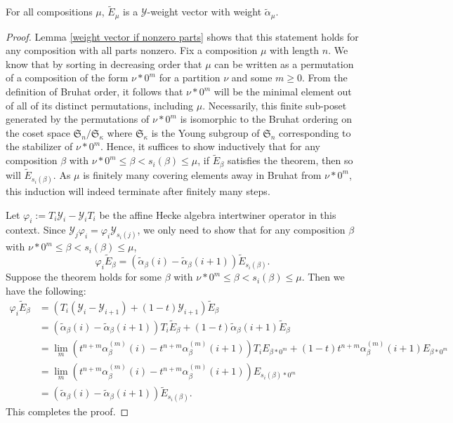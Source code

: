 \documentclass[ALCO,Unicode]{cedram}
\newcommand{\y}{{ \mathscr{Y} }}
\begin{document}
\begin{thm} \label{weight vector for all}
For all compositions $\mu$, $\widetilde{E}_{\mu}$ is a $\y$-weight vector with weight $\widetilde{\alpha}_{\mu}.$
\end{thm}

\begin{proof}
 Lemma \ref{weight vector if nonzero parts} shows that this statement holds for any composition with all parts nonzero. Fix a composition $\mu$ with length $n$. We know that by sorting in decreasing order that $\mu$ can be written as a permutation of a composition of the form $\nu * 0^m$ for a partition $\nu$ and some $m \geq 0$. From the definition of Bruhat order, it follows that $\nu*0^m$ will be the minimal element out of all of its distinct permutations, including $\mu$. Necessarily, this finite sub-poset generated by the permutations of $\nu*0^m$ is isomorphic to the Bruhat ordering on the coset space $\mathfrak{S}_n/\mathfrak{S}_{\kappa}$ where $\mathfrak{S}_{\kappa}$ is the Young subgroup of $\mathfrak{S}_n$ corresponding to the stabilizer of $\nu*0^m$. Hence, it suffices to show inductively that for any composition $\beta$ with $\nu*0^m \leq \beta < s_i(\beta) \leq \mu$, if $\widetilde{E}_{\beta}$ satisfies the theorem, then so will $\widetilde{E}_{s_i(\beta)}$. As $\mu$ is finitely many covering elements away in Bruhat from $\nu*0^m$, this induction will indeed terminate after finitely many steps.
 
Let $\varphi_i := T_i\y_i-\y_iT_i$ be the affine Hecke algebra intertwiner operator in this context. Since $\y_j\varphi_i = \varphi_i \y_{s_i(j)}$, we only need to show that for any composition $\beta$ with $\nu*0^m \leq \beta < s_i(\beta) \leq \mu$, $$\varphi_i \widetilde{E}_{\beta} = (\widetilde{\alpha}_{\beta}(i) - \widetilde{\alpha}_{\beta}(i+1))\widetilde{E}_{s_i(\beta)}.$$ Suppose the theorem holds for some $\beta$ with $\nu*0^m \leq \beta < s_i(\beta) \leq \mu$. Then we have the following:
\begin{align*}
    \varphi_{i}\widetilde{E}_{\beta} &= (T_i(\y_i - \y_{i+1}) + (1-t)\y_{i+1})\widetilde{E}_{\beta} \\
    &= (\widetilde{\alpha}_{\beta}(i)- \widetilde{\alpha}_{\beta}(i+1))T_i\widetilde{E}_{\beta} + (1-t)\widetilde{\alpha}_{\beta}(i+1)\widetilde{E}_{\beta} \\
    &= \lim_{m} (t^{n+m}\alpha_{\beta}^{(m)}(i)- t^{n+m}\alpha_{\beta}^{(m)}(i+1))T_iE_{\beta *0^m} + (1-t)t^{n+m}\alpha_{\beta}^{(m)}(i+1)E_{\beta *0^m} \\
    &= \lim_{m}(t^{n+m}\alpha_{\beta}^{(m)}(i)- t^{n+m}\alpha_{\beta}^{(m)}(i+1))E_{s_i(\beta) *0^m}\\
    &= (\widetilde{\alpha}_{\beta}(i) - \widetilde{\alpha}_{\beta}(i+1))\widetilde{E}_{s_i(\beta)}.
\end{align*}
This completes the proof.
\end{proof}
\end{document}
